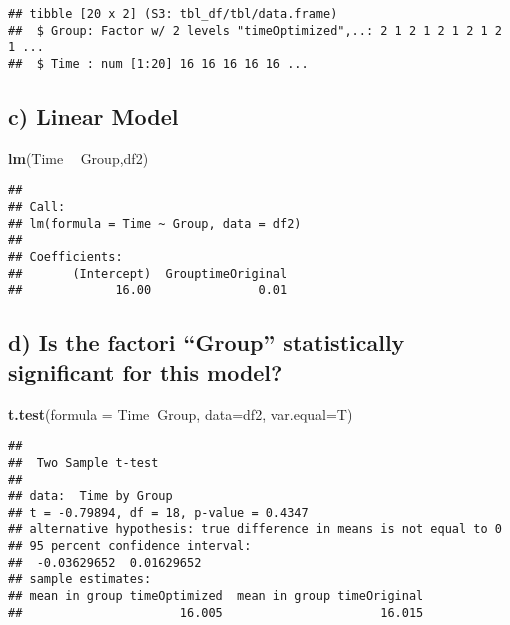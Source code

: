 \documentclass[
]{article}
\newenvironment{Shaded}{\begin{snugshade}}{\end{snugshade}}
\newcommand{\DataTypeTok}[1]{\textcolor[rgb]{0.13,0.29,0.53}{#1}}
\newcommand{\KeywordTok}[1]{\textcolor[rgb]{0.13,0.29,0.53}{\textbf{#1}}}
\newcommand{\NormalTok}[1]{#1}
\newcommand{\OperatorTok}[1]{\textcolor[rgb]{0.81,0.36,0.00}{\textbf{#1}}}
\newcommand{\StringTok}[1]{\textcolor[rgb]{0.31,0.60,0.02}{#1}}
\begin{document}
\begin{Shaded}
\end{Shaded}

\begin{verbatim}
## tibble [20 x 2] (S3: tbl_df/tbl/data.frame)
##  $ Group: Factor w/ 2 levels "timeOptimized",..: 2 1 2 1 2 1 2 1 2 1 ...
##  $ Time : num [1:20] 16 16 16 16 16 ...
\end{verbatim}

\hypertarget{c-linear-model}{%
\subsection{c) Linear Model}\label{c-linear-model}}

\begin{Shaded}
\begin{Highlighting}[]
\KeywordTok{lm}\NormalTok{(Time }\OperatorTok{~}\StringTok{ }\NormalTok{Group,df2)}
\end{Highlighting}
\end{Shaded}

\begin{verbatim}
## 
## Call:
## lm(formula = Time ~ Group, data = df2)
## 
## Coefficients:
##       (Intercept)  GrouptimeOriginal  
##             16.00               0.01
\end{verbatim}

\hypertarget{d-is-the-factori-group-statistically-significant-for-this-model}{%
\subsection{d) Is the factori ``Group'' statistically significant for
this
model?}\label{d-is-the-factori-group-statistically-significant-for-this-model}}

\begin{Shaded}
\begin{Highlighting}[]
\KeywordTok{t.test}\NormalTok{(}\DataTypeTok{formula =}\NormalTok{ Time}\OperatorTok{~}\NormalTok{Group,}
       \DataTypeTok{data=}\NormalTok{df2, }\DataTypeTok{var.equal=}\NormalTok{T)}
\end{Highlighting}
\end{Shaded}

\begin{verbatim}
## 
##  Two Sample t-test
## 
## data:  Time by Group
## t = -0.79894, df = 18, p-value = 0.4347
## alternative hypothesis: true difference in means is not equal to 0
## 95 percent confidence interval:
##  -0.03629652  0.01629652
## sample estimates:
## mean in group timeOptimized  mean in group timeOriginal 
##                      16.005                      16.015
\end{verbatim}
\end{document}
